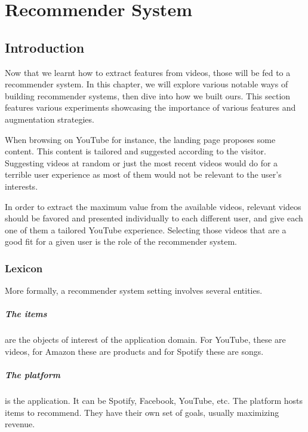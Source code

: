 \chapter{Recommender System}
\label{chap:recsys}

\section{Introduction}

Now that we learnt how to extract features from videos, those will be fed to a recommender system. In this chapter, we will explore various notable ways of building recommender systems, then dive into how we built ours. This section features various experiments showcasing the importance of various features and augmentation strategies.

When browsing on YouTube for instance, the landing page proposes some content. This content is tailored and suggested according to the visitor. Suggesting videos at random or just the most recent videos would do for a terrible user experience as most of them would not be relevant to the user's interests.

In order to extract the maximum value from the available videos, relevant videos should be favored and presented individually to each different user, and give each one of them a tailored YouTube experience. Selecting those videos that are a good fit for a given user is the role of the recommender system.

\subsection{Lexicon} %

More formally, a recommender system setting involves several entities.

\paragraph{The items} are the objects of interest of the application domain. For YouTube, these are videos, for Amazon these are products and for Spotify these are songs.

\paragraph{The platform} is the application. It can be Spotify, Facebook, YouTube, etc. The platform hosts items to recommend. They have their own set of goals, usually maximizing revenue.

